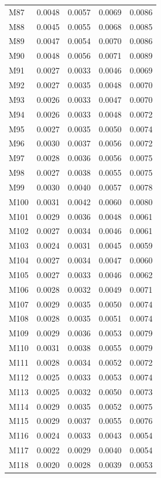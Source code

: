 \begin{longtable}{lrrrr}
M87 & 0.0048 & 0.0057 & 0.0069 & 0.0086 \\
M88 & 0.0045 & 0.0055 & 0.0068 & 0.0085 \\
M89 & 0.0047 & 0.0054 & 0.0070 & 0.0086 \\
M90 & 0.0048 & 0.0056 & 0.0071 & 0.0089 \\
M91 & 0.0027 & 0.0033 & 0.0046 & 0.0069 \\
M92 & 0.0027 & 0.0035 & 0.0048 & 0.0070 \\
M93 & 0.0026 & 0.0033 & 0.0047 & 0.0070 \\
M94 & 0.0026 & 0.0033 & 0.0048 & 0.0072 \\
M95 & 0.0027 & 0.0035 & 0.0050 & 0.0074 \\
M96 & 0.0030 & 0.0037 & 0.0056 & 0.0072 \\
M97 & 0.0028 & 0.0036 & 0.0056 & 0.0075 \\
M98 & 0.0027 & 0.0038 & 0.0055 & 0.0075 \\
M99 & 0.0030 & 0.0040 & 0.0057 & 0.0078 \\
M100 & 0.0031 & 0.0042 & 0.0060 & 0.0080 \\
M101 & 0.0029 & 0.0036 & 0.0048 & 0.0061 \\
M102 & 0.0027 & 0.0034 & 0.0046 & 0.0061 \\
M103 & 0.0024 & 0.0031 & 0.0045 & 0.0059 \\
M104 & 0.0027 & 0.0034 & 0.0047 & 0.0060 \\
M105 & 0.0027 & 0.0033 & 0.0046 & 0.0062 \\
M106 & 0.0028 & 0.0032 & 0.0049 & 0.0071 \\
M107 & 0.0029 & 0.0035 & 0.0050 & 0.0074 \\
M108 & 0.0028 & 0.0035 & 0.0051 & 0.0074 \\
M109 & 0.0029 & 0.0036 & 0.0053 & 0.0079 \\
M110 & 0.0031 & 0.0038 & 0.0055 & 0.0079 \\
M111 & 0.0028 & 0.0034 & 0.0052 & 0.0072 \\
M112 & 0.0025 & 0.0033 & 0.0053 & 0.0074 \\
M113 & 0.0025 & 0.0032 & 0.0050 & 0.0073 \\
M114 & 0.0029 & 0.0035 & 0.0052 & 0.0075 \\
M115 & 0.0029 & 0.0037 & 0.0055 & 0.0076 \\
M116 & 0.0024 & 0.0033 & 0.0043 & 0.0054 \\
M117 & 0.0022 & 0.0029 & 0.0040 & 0.0054 \\
M118 & 0.0020 & 0.0028 & 0.0039 & 0.0053 \\

\end{longtable}

